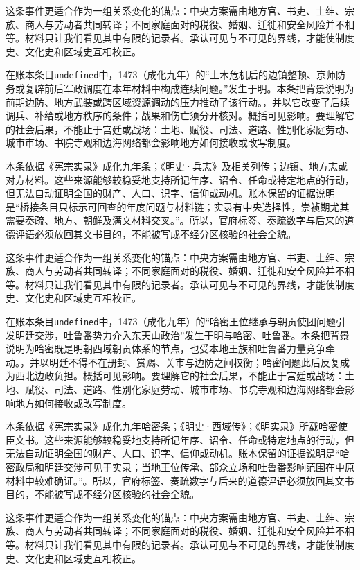 这条事件更适合作为一组关系变化的锚点：中央方案需由地方官、书吏、士绅、宗族、商人与劳动者共同转译；不同家庭面对的税役、婚姻、迁徙和安全风险并不相等。材料只让我们看见其中有限的记录者。承认可见与不可见的界线，才能使制度史、文化史和区域史互相校正。

在账本条目\texttt{undefined}中，1473（成化九年）的“土木危机后的边镇整顿、京师防务或复辟前后军政调度在本年材料中构成连续问题。”发生于明。本条把背景说明为前期边防、地方武装或跨区域资源调动的压力推动了该行动。，并以它改变了后续调兵、补给或地方秩序的条件；战果和伤亡须分开核对。概括可见影响。要理解它的社会后果，不能止于宫廷或战场：土地、赋役、司法、道路、性别化家庭劳动、城市市场、书院寺观和边海网络都会影响地方如何接收或改写制度。

本条依据《宪宗实录》成化九年条；《明史·兵志》及相关列传；边镇、地方志或对方材料。这些来源能够较稳妥地支持所记年序、诏令、任命或特定地点的行动，但无法自动证明全国的财产、人口、识字、信仰或动机。账本保留的证据说明是“桥接条目只标示可回查的年度问题与材料链；实录有中央选择性，崇祯期尤其需要奏疏、地方、朝鲜及满文材料交叉。”。所以，官府标签、奏疏数字与后来的道德评语必须放回其文书目的，不能被写成不经分区核验的社会全貌。

这条事件更适合作为一组关系变化的锚点：中央方案需由地方官、书吏、士绅、宗族、商人与劳动者共同转译；不同家庭面对的税役、婚姻、迁徙和安全风险并不相等。材料只让我们看见其中有限的记录者。承认可见与不可见的界线，才能使制度史、文化史和区域史互相校正。

在账本条目\texttt{undefined}中，1473（成化九年）的“哈密王位继承与朝贡使团问题引发明廷交涉，吐鲁番势力介入东天山政治”发生于明与哈密、吐鲁番。本条把背景说明为哈密既是明朝西域朝贡体系的节点，也受本地王族和吐鲁番力量竞争牵动。，并以明廷不得不在册封、赏赐、关市与边防之间权衡；哈密问题此后反复成为西北边政负担。概括可见影响。要理解它的社会后果，不能止于宫廷或战场：土地、赋役、司法、道路、性别化家庭劳动、城市市场、书院寺观和边海网络都会影响地方如何接收或改写制度。

本条依据《宪宗实录》成化九年哈密条；《明史·西域传》；《明实录》所载哈密使臣文书。这些来源能够较稳妥地支持所记年序、诏令、任命或特定地点的行动，但无法自动证明全国的财产、人口、识字、信仰或动机。账本保留的证据说明是“哈密政局和明廷交涉可见于实录；当地王位传承、部众立场和吐鲁番影响范围在中原材料中较难确证。”。所以，官府标签、奏疏数字与后来的道德评语必须放回其文书目的，不能被写成不经分区核验的社会全貌。

这条事件更适合作为一组关系变化的锚点：中央方案需由地方官、书吏、士绅、宗族、商人与劳动者共同转译；不同家庭面对的税役、婚姻、迁徙和安全风险并不相等。材料只让我们看见其中有限的记录者。承认可见与不可见的界线，才能使制度史、文化史和区域史互相校正。

